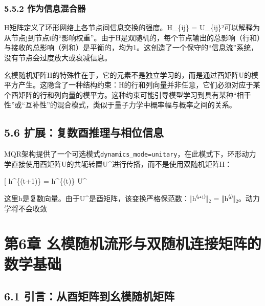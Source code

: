 \documentclass[
  12pt,
]{article}
\begin{document}
\hypertarget{ux4f5cux4e3aux4fe1ux606fux6df7ux5408ux5668}{%
\subsubsection{5.5.2
作为信息混合器}\label{ux4f5cux4e3aux4fe1ux606fux6df7ux5408ux5668}}

H矩阵定义了环形网络上各节点间信息交换的强度。H\_\{ij\} =
\textbar U\_\{ij\}\textbar²可以解释为从节点j到节点i的``影响权重''。由于H是双随机的，每个节点输出的总影响（行和）与接收的总影响（列和）是平衡的，均为1。这创造了一个保守的``信息流''系统，没有节点会过度放大或衰减信息。

幺模随机矩阵H的特殊性在于，它的元素不是独立学习的，而是通过酉矩阵U的模平方产生。这隐含了一种结构约束：H的行和列向量并非任意，它们必须对应于某个酉矩阵的行和列向量的模平方。这种约束可能引导模型学习到具有某种``相干性''或``互补性''的混合模式，类似于量子力学中概率幅与概率之间的关系。

\hypertarget{ux6269ux5c55ux590dux6570ux9149ux63a8ux7406ux4e0eux76f8ux4f4dux4fe1ux606f}{%
\subsection{5.6
扩展：复数酉推理与相位信息}\label{ux6269ux5c55ux590dux6570ux9149ux63a8ux7406ux4e0eux76f8ux4f4dux4fe1ux606f}}

MQR架构提供了一个可选模式\texttt{dynamics\_mode=\textquotesingle{}unitary\textquotesingle{}}，在此模式下，环形动力学直接使用酉矩阵U的共轭转置U^{\dagger}进行传播，而不是使用双随机矩阵H：

{[} h\^{}\{(t+1)\} = h\^{}\{(t)\} U\^{}\dagger {]}

这里h是复数向量。由于U^{\dagger}是酉矩阵，该变换严格保范数：‖h⁽ᵗ⁺¹⁾‖₂ =
‖h⁽ᵗ⁾‖₂。动力学将不会收敛

\hypertarget{ux7b2c6ux7ae0-ux5e7aux6a21ux968fux673aux6d41ux5f62ux4e0eux53ccux968fux673aux8fdeux63a5ux77e9ux9635ux7684ux6570ux5b66ux57faux7840}{%
\section{第6章
幺模随机流形与双随机连接矩阵的数学基础}\label{ux7b2c6ux7ae0-ux5e7aux6a21ux968fux673aux6d41ux5f62ux4e0eux53ccux968fux673aux8fdeux63a5ux77e9ux9635ux7684ux6570ux5b66ux57faux7840}}

\hypertarget{ux5f15ux8a00ux4eceux9149ux77e9ux9635ux5230ux5e7aux6a21ux968fux673aux77e9ux9635}{%
\subsection{6.1
引言：从酉矩阵到幺模随机矩阵}\label{ux5f15ux8a00ux4eceux9149ux77e9ux9635ux5230ux5e7aux6a21ux968fux673aux77e9ux9635}}
\end{document}

